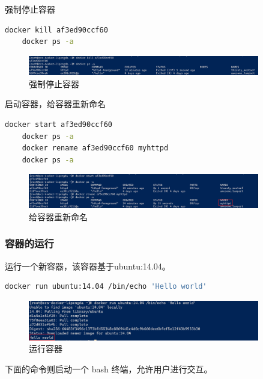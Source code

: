 \documentclass{article}
\begin{document}
强制停止容器

\begin{lstlisting}[language=bash]
    docker kill af3ed90ccf60
    docker ps -a
\end{lstlisting}

\begin{figure}[H]
\centering
\includegraphics[width=0.9\textwidth]{img/0.2.4.1.8.png}
\caption{强制停止容器}
\end{figure}

启动容器，给容器重新命名

\begin{lstlisting}[language=bash]
    docker start af3ed90ccf60
    docker ps -a
    docker rename af3ed90ccf60 myhttpd
    docker ps -a
\end{lstlisting}

\begin{figure}[H]
\centering
\includegraphics[width=0.9\textwidth]{img/0.2.4.1.9.png}
\caption{给容器重新命名}
\end{figure}

\subsubsection{容器的运行}

运行一个新容器，该容器基于ubuntu:14.04。

\begin{lstlisting}[language=bash]
    docker run ubuntu:14.04 /bin/echo 'Hello world'
\end{lstlisting}

\begin{figure}[H]
\centering
\includegraphics[width=0.9\textwidth]{img/0.2.4.2.1.png}
\caption{运行容器}
\end{figure}

下面的命令则启动一个 bash 终端，允许用户进行交互。
\end{document}
